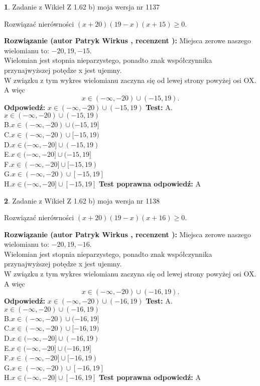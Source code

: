 \documentclass[12pt, a4paper]{article}
\theoremstyle{definition} %
\newtheorem{zad}{}
\newcommand{\zadStart}[1]{\begin{zad}#1\newline}
\newcommand{\zadStop}{\end{zad}}
\newcommand{\rozwStart}[2]{\noindent \textbf{Rozwiązanie (autor #1 , recenzent #2): }\newline}
\newcommand{\rozwStop}{\newline}
\newcommand{\odpStart}{\noindent \textbf{Odpowiedź:}\newline}
\newcommand{\odpStop}{\newline}
\newcommand{\testStart}{\noindent \textbf{Test:}\newline}
\newcommand{\testStop}{\newline}
\newcommand{\kluczStart}{\noindent \textbf{Test poprawna odpowiedź:}\newline}
\newcommand{\kluczStop}{\newline}
\begin{document}
\zadStart{Zadanie z Wikieł Z 1.62 b) moja wersja nr 1137}

Rozwiązać nierówności $(x+20)(19-x)(x+15)\ge0$.
\zadStop
\rozwStart{Patryk Wirkus}{}
Miejsca zerowe naszego wielomianu to: $-20, 19, -15$.\\
Wielomian jest stopnia nieparzystego, ponadto znak współczynnika przy\linebreak najwyższej potędze x jest ujemny.\\ W związku z tym wykres wielomianu zaczyna się od lewej strony powyżej osi OX. A więc $$x \in (-\infty,-20) \cup (-15,19).$$
\rozwStop
\odpStart
$x \in (-\infty,-20) \cup (-15,19)$
\odpStop
\testStart
A.$x \in (-\infty,-20) \cup (-15,19)$\\
B.$x \in (-\infty,-20) \cup (-15,19]$\\
C.$x \in (-\infty,-20) \cup [-15,19)$\\
D.$x \in (-\infty,-20] \cup (-15,19)$\\
E.$x \in (-\infty,-20] \cup (-15,19]$\\
F.$x \in (-\infty,-20] \cup [-15,19)$\\
G.$x \in (-\infty,-20) \cup [-15,19]$\\
H.$x \in (-\infty,-20] \cup [-15,19]$
\testStop
\kluczStart
A
\kluczStop



\zadStart{Zadanie z Wikieł Z 1.62 b) moja wersja nr 1138}

Rozwiązać nierówności $(x+20)(19-x)(x+16)\ge0$.
\zadStop
\rozwStart{Patryk Wirkus}{}
Miejsca zerowe naszego wielomianu to: $-20, 19, -16$.\\
Wielomian jest stopnia nieparzystego, ponadto znak współczynnika przy\linebreak najwyższej potędze x jest ujemny.\\ W związku z tym wykres wielomianu zaczyna się od lewej strony powyżej osi OX. A więc $$x \in (-\infty,-20) \cup (-16,19).$$
\rozwStop
\odpStart
$x \in (-\infty,-20) \cup (-16,19)$
\odpStop
\testStart
A.$x \in (-\infty,-20) \cup (-16,19)$\\
B.$x \in (-\infty,-20) \cup (-16,19]$\\
C.$x \in (-\infty,-20) \cup [-16,19)$\\
D.$x \in (-\infty,-20] \cup (-16,19)$\\
E.$x \in (-\infty,-20] \cup (-16,19]$\\
F.$x \in (-\infty,-20] \cup [-16,19)$\\
G.$x \in (-\infty,-20) \cup [-16,19]$\\
H.$x \in (-\infty,-20] \cup [-16,19]$
\testStop
\kluczStart
A
\kluczStop
\end{document}
